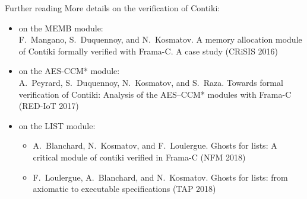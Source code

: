 \begin{frame}{Further reading}
  More details on the verification of Contiki:
  \begin{small}
    \begin{itemize}
    \item on the MEMB module:\\
      F.~Mangano, S.~Duquennoy, and N.~Kosmatov. A memory allocation module of
      Contiki formally verified with {Frama-C}. A case study (CRiSIS 2016)
    \item on the AES-CCM* module:\\
      A.~Peyrard, S.~Duquennoy, N.~Kosmatov, and S.~Raza. Towards formal
      verification of Contiki: Analysis of the AES–CCM* modules with Frama-C
      (RED-IoT 2017)
    \item on the LIST module:
      \begin{itemize}
      \item A.~Blanchard, N.~Kosmatov, and F.~Loulergue. Ghosts for
        lists: A critical module of contiki verified in Frama-C (NFM
        2018)
      \item F.~Loulergue, A.~Blanchard, and N.~Kosmatov. Ghosts for
        lists: from axiomatic to executable specifications (TAP 2018)
      \end{itemize}
    \end{itemize}
  \end{small}
\end{frame}

